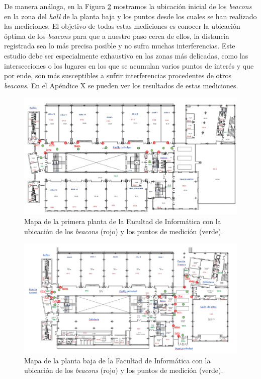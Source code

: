 De manera análoga, en la Figura \ref{fig:medidasPBaja} mostramos la ubicación inicial de los \textit{beacons} en la zona del \textit{hall} de la planta baja y los puntos desde los cuales se han realizado las mediciones. El objetivo de todas estas mediciones es conocer la ubicación óptima de los \textit{beacons} para que a nuestro paso cerca de ellos, la distancia registrada sea lo más precisa posible y no sufra muchas interferencias. Este estudio debe ser especialmente exhaustivo en las zonas más delicadas, como las intersecciones o los lugares en los que se acumulan varios puntos de interés y que por ende, son más susceptibles a sufrir interferencias procedentes de otros \textit{beacons}. En el Apéndice X se pueden ver los resultados de estas mediciones. 


\begin{figure}[t]
	\centering
	\includegraphics[width=1\textwidth]{Imagenes/Descripciondeltrabajo/mapa_mediciones_planta1}
	\caption{Mapa de la primera planta de la Facultad de Informática con la ubicación de los \textit{beacons} (rojo) y los puntos de medición (verde). }
	\label{fig:medidasPPrimera}
\end{figure}

\begin{figure}[!h]
	\centering
	\includegraphics[width=1\textwidth]{Imagenes/Descripciondeltrabajo/mapa_mediciones_plantabaja}
	\caption{Mapa de la planta baja de la Facultad de Informática con la ubicación de los \textit{beacons} (rojo) y los puntos de medición (verde). }
	\label{fig:medidasPBaja}
\end{figure}


